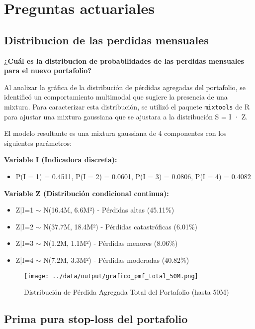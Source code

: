 \section{Preguntas actuariales}

\subsection{Distribucion de las perdidas mensuales}

\textbf{¿Cuál es la distribucion de probabilidades de las perdidas mensuales para el nuevo portafolio?}

Al analizar la gráfica de la distribución de pérdidas agregadas del portafolio, se identificó un comportamiento multimodal que sugiere la presencia de una mixtura. Para caracterizar esta distribución, se utilizó el paquete \texttt{mixtools} de R para ajustar una mixtura gaussiana que se ajustara a la distribución S = I · Z.

El modelo resultante es una mixtura gaussiana de 4 componentes con los siguientes parámetros:

\textbf{Variable I (Indicadora discreta):}
\begin{itemize}
\item P(I = 1) = 0.4511, P(I = 2) = 0.0601, P(I = 3) = 0.0806, P(I = 4) = 0.4082
\end{itemize}

\textbf{Variable Z (Distribución condicional continua):}
\begin{itemize}
\item Z|I=1 $\sim$ N(16.4M, 6.6M²) - Pérdidas altas (45.11\%)
\item Z|I=2 $\sim$ N(37.7M, 18.4M²) - Pérdidas catastróficas (6.01\%)  
\item Z|I=3 $\sim$ N(1.2M, 1.1M²) - Pérdidas menores (8.06\%)
\item Z|I=4 $\sim$ N(7.2M, 3.3M²) - Pérdidas moderadas (40.82\%)
\end{itemize}

\begin{figure}[H]
\centering
\texttt{[image: ../data/output/grafico\_pmf\_total\_50M.png]}
\caption{Distribución de Pérdida Agregada Total del Portafolio (hasta 50M)}
\label{fig:pmf_total}
\end{figure}

\subsection{Prima pura stop-loss del portafolio}

